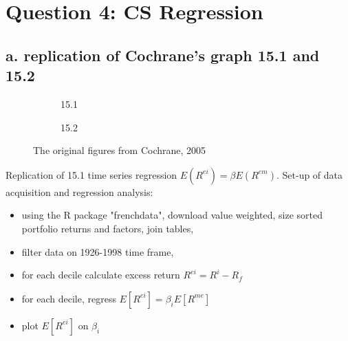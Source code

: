 \documentclass[]{article}
\title{}
\author{}
\begin{document}
	
	\maketitle
	
	
\section*{Question 4: CS Regression}
\subsection*{a. replication of Cochrane's graph 15.1 and 15.2}
	
\begin{figure}[h]
	\begin{subfigure}{0.5\textwidth}
		\caption{15.1}
		\label{fig:subim1}
	\end{subfigure}
	\begin{subfigure}{0.5\textwidth}
		\caption{15.2}
		\label{fig:subim2}
	\end{subfigure}	
	\caption{The original figures from Cochrane, 2005}
	\label{fig:image1}
\end{figure}

Replication of 15.1 time series regression $E(R^{ei}) = \beta E(R^{em})$. Set-up of data acquisition and regression analysis:

\begin{itemize}
	\item using the R package "frenchdata", download value weighted, size sorted portfolio returns and factors, join tables,
	\item filter data on 1926-1998 time frame,
	\item for each decile calculate excess return $R^{ei} = R^{i} - R_{f}$
	\item for each decile, regress $E[R^{ei}] = \beta_i E[R^{me}]$
	\item plot $E[R^{ei}]$ on $\beta_i$
\end{itemize}
\end{document}
